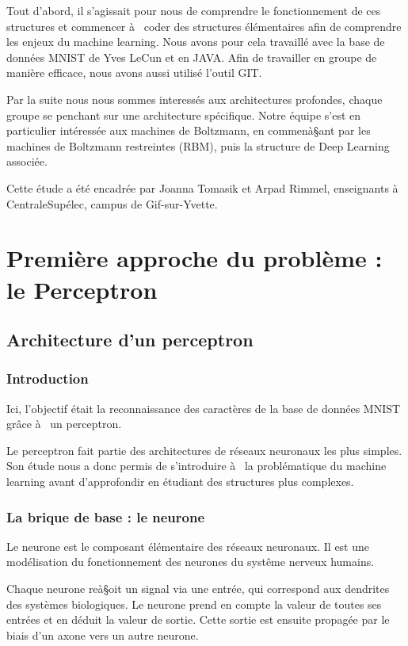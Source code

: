 \documentclass[a4paper,twoside]{report}
\begin{document}
Tout d'abord, il s'agissait pour nous de comprendre le fonctionnement de ces structures et commencer à  coder des structures élémentaires afin de comprendre les enjeux du machine learning. Nous avons pour cela travaillé avec la base de données MNIST de Yves LeCun et en JAVA. Afin de travailler en groupe de manière efficace, nous avons aussi utilisé l'outil GIT.

Par la suite nous nous sommes interessés aux architectures profondes, chaque groupe se penchant sur une architecture spécifique. Notre équipe s'est en particulier intéressée aux machines de Boltzmann, en commenà§ant par les machines de Boltzmann restreintes (RBM), puis la structure de Deep Learning associée.

Cette étude a été encadrée par Joanna Tomasik et Arpad Rimmel, enseignants à  CentraleSupélec, campus de Gif-sur-Yvette.



\part[Le Perceptron]{Première approche du problème : le Perceptron}


\chapter{Architecture d'un perceptron}

\section{Introduction}

Ici, l'objectif était la reconnaissance des caractères de la base de données MNIST grâce à  un perceptron.

Le perceptron fait partie des architectures de réseaux neuronaux les plus simples. Son étude nous a donc permis de s'introduire à  la problématique du machine learning avant d'approfondir en étudiant des structures plus complexes.


\section{La brique de base : le neurone}

Le neurone est le composant élémentaire des réseaux neuronaux. Il est une modélisation du fonctionnement des neurones du systême nerveux humains.

Chaque neurone reà§oit un signal via une entrée, qui correspond aux dendrites des systèmes biologiques. Le neurone prend en compte la valeur de toutes ses entrées et en déduit la valeur de sortie. Cette sortie est ensuite propagée par le biais d'un axone vers un autre neurone.\\
\end{document}
